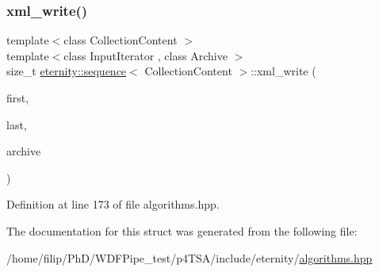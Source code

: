 \subsubsection{\texorpdfstring{xml\+\_\+write()}{xml\_write()}}
{\footnotesize\ttfamily template$<$class Collection\+Content $>$ \\
template$<$class Input\+Iterator , class Archive $>$ \\
size\+\_\+t \hyperlink{structeternity_1_1sequence}{eternity\+::sequence}$<$ Collection\+Content $>$\+::xml\+\_\+write (\begin{DoxyParamCaption}\item[{Input\+Iterator}]{first,  }\item[{Input\+Iterator}]{last,  }\item[{Archive \&}]{archive }\end{DoxyParamCaption})}



Definition at line 173 of file algorithms.\+hpp.



The documentation for this struct was generated from the following file\+:\begin{DoxyCompactItemize}
\item 
/home/filip/\+Ph\+D/\+W\+D\+F\+Pipe\+\_\+test/p4\+T\+S\+A/include/eternity/\hyperlink{algorithms_8hpp}{algorithms.\+hpp}\end{DoxyCompactItemize}
